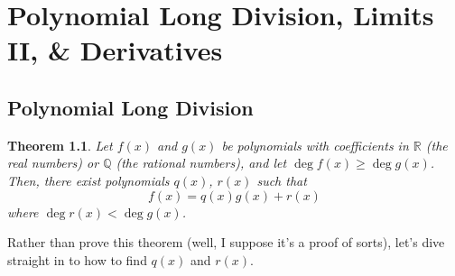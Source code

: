 \documentclass[english]{book}
\newcommand{\RR}{\mathbb{R}}
\newcommand{\QQ}{\mathbb{Q}}
\newtheorem{theorem}{Theorem}[section]
\theoremstyle{remark}
\theoremstyle{definition}
\newtheorem*{next week}{Next Week}
\begin{document}
\chapter{Polynomial Long Division, Limits II, \& Derivatives}
\setcounter{section}{-1}
\section{Polynomial Long Division}
\begin{theorem}
	Let $f(x)$ and $g(x)$ be polynomials with coefficients in $\RR$ (the real numbers) or $\QQ$ (the rational numbers), and let $\deg f(x)\geq \deg g(x)$. Then, there exist polynomials  $q(x)$, $r(x)$ such that $$f(x)=q(x)g(x)+r(x)$$ where $\deg r(x)<\deg g(x)$. 
 \end{theorem}
Rather than prove this theorem (well, I suppose it's a proof of sorts), let's dive straight in to how to find $q(x)$ and $r(x)$.
\end{document}
